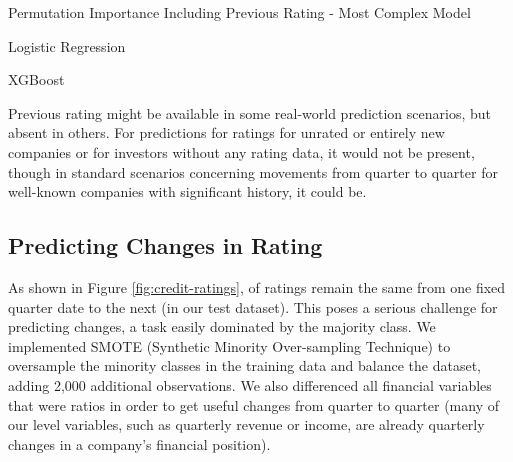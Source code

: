 \documentclass{article}[11pt]
\begin{document}
    \begin{table}[h!]
        \centering
        \caption{Permutation Importance Including Previous Rating - Most Complex Model}
        \begin{minipage}[c]{0.495\linewidth}
            \centering
            
            \caption*{\footnotesize Logistic Regression} 
        \end{minipage}
        \begin{minipage}[c]{0.495\linewidth}
            \centering
            
            \caption*{\footnotesize XGBoost} 
        \end{minipage}
        \label{tab:include-previous-permutation-importance}
    \end{table}

    Previous rating might be available in some real-world prediction scenarios, but absent in others. For predictions for ratings for unrated or entirely new companies or for investors without any rating data, it would not be present, though in standard scenarios concerning movements from quarter to quarter for well-known companies with significant history, it could be.

    \clearpage
    \newpage

    \subsection{Predicting Changes in Rating}

    \label{sec:change-prediction}

    As shown in Figure \ref{fig:credit-ratings}, \shareNotChanges \space of ratings remain the same from one fixed quarter date to the next (\shareNotChangesTest \space in our test dataset). This poses a serious challenge for predicting changes, a task easily dominated by the majority class. We implemented SMOTE (Synthetic Minority Over-sampling Technique) \citep{chawla_smote_2002} to oversample the minority classes in the training data and balance the dataset, adding 2,000 additional observations. We also differenced all financial variables that were ratios in order to get useful changes from quarter to quarter (many of our level variables, such as quarterly revenue or income, are already quarterly changes in a company's financial position).
\end{document}
